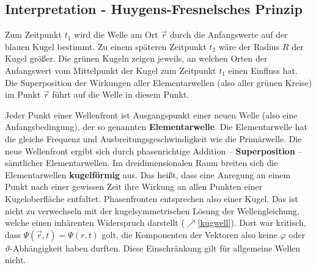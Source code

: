   \subsection{Interpretation - Huygens-Fresnelsches Prinzip}\label{huy}
  Zum Zeitpunkt $t_1$ wird die Welle am Ort $\vec{r}$ durch die Anfangswerte auf der blauen Kugel bestimmt. Zu einem späteren Zeitpunkt $t_2$ wäre der Radius $R$ der Kugel größer. Die grünen Kugeln zeigen jeweils, an welchen Orten der Anfangswert vom Mittelpunkt der Kugel zum Zeitpunkt $t_1$ einen Einfluss hat. Die Superposition der Wirkungen aller Elementarwellen (also aller grünen Kreise) im Punkt $\vec{r}$ führt auf die Welle in diesem Punkt.
	  \begin{center}
		  
	  \end{center}
	  Jeder Punkt einer Wellenfront ist Ausgangspunkt einer neuen Welle (also eine Anfangsbedingung), der so genannten \textbf{Elementarwelle}. Die Elementarwelle hat die gleiche Frequenz und Ausbreitungsgeschwindigkeit wie die Primärwelle. Die neue Wellenfront ergibt sich durch phasenrichtige Addition -- \textbf{Superposition} -- sämtlicher Elementarwellen. Im dreidimensionalen Raum breiten sich die Elementarwellen \textbf{kugelförmig} aus. Das heißt, dass eine Anregung an einem Punkt nach einer gewissen Zeit ihre Wirkung an allen Punkten einer Kugeloberfläche entfaltet. Phasenfronten entsprechen also einer Kugel. Das ist nicht zu verwechseln mit der kugelsymmetrischen Lösung der Wellengleichung, welche einen inhärenten Widerspruch darstellt ($\nearrow$\ref{kugwell}). Dort war kritisch, dass $\Psi(\vec{r},t)=\Psi(r,t)$ golt, die Komponenten der Vektoren also keine $\varphi$ oder $\vartheta$-Abhängigkeit haben durften. Diese Einschränkung gilt für allgemeine Wellen nicht.
